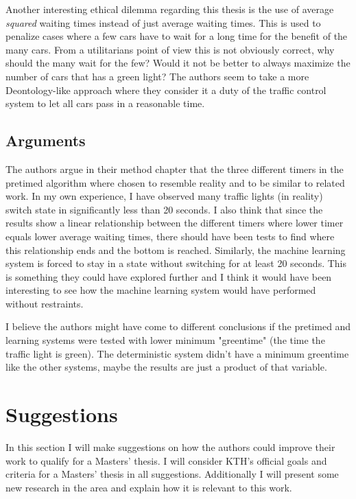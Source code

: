 \documentclass[10pt, a4paper]{article}
\begin{document}
Another interesting ethical dilemma regarding this thesis is the use of average \textit{squared} waiting times instead of just average waiting times.
This is used to penalize cases where a few cars have to wait for a long time for the benefit of the many cars.
From a utilitarians point of view this is not obviously correct, why should the many wait for the few? Would it not be better to always maximize the
number of cars that has a green light? The authors seem to take a more Deontology-like approach where they consider it a duty of the traffic
control system to let all cars pass in a reasonable time. 

\subsection{Arguments}
The authors argue in their method chapter that the three different timers in the pretimed algorithm where chosen to resemble reality and to
be similar to related work. In my own experience, I have observed many traffic lights (in reality) switch state in significantly less than
20 seconds. I also think that since the results show a linear relationship between the different timers where lower timer equals lower average
waiting times, there should have been tests to find where this relationship ends and the bottom is reached.
Similarly, the machine learning system is forced to stay in a state without switching for at least 20 seconds. This is something they could have
explored further and I think it would have been interesting to see how the machine learning system would have performed without restraints.

I believe the authors might have come to different conclusions if the pretimed and learning systems were tested with lower minimum "greentime"
(the time the traffic light is green). The deterministic system didn't have a minimum greentime like the other systems, maybe the results are 
just a product of that variable.

\section{Suggestions}
In this section I will make suggestions on how the authors could improve their work to qualify for a Masters' thesis.
I will consider KTH's official goals and criteria for a Masters' thesis\cite{criteria} in all suggestions.
Additionally I will present some new research in the area and explain how it is relevant to this work.
\end{document}
